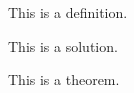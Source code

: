 \documentclass{article}
\begin{document}
\begin{definition}
This is a definition.
\end{definition}

\begin{solution}
This is a solution.
\end{solution}

\begin{theorem}
This is a theorem.
\end{theorem}
\end{document}
